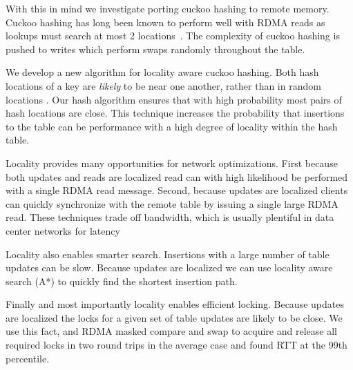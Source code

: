 With this in mind we investigate porting cuckoo hashing to
remote memory. Cuckoo hashing has long been known to perform
well with RDMA reads as lookups must search at most 2
locations~\cite{pilaf, farm}. The complexity of cuckoo
hashing is pushed to writes which perform swaps randomly
throughout the table. 

We develop a new algorithm for locality aware cuckoo
hashing. Both hash locations of a key are \textit{likely} to
be near one another, rather than in random locations . Our
hash algorithm ensures that with high probability most pairs
of hash locations are close.  This technique increases the
probability that insertions to the table can be performance
with a high degree of locality within the hash table.

Locality provides many opportunities for network
optimizations. First because both updates and reads are
localized read can with high likelihood be performed with a
single RDMA read message. Second, because updates are
localized clients can quickly synchronize with the remote
table by issuing a single large RDMA read. These techniques
trade off bandwidth, which is usually plentiful in data
center networks for latency 

Locality also enables smarter search. Insertions with a
large number of table updates can be slow. Because updates
are localized we can use locality aware search (A*) to
quickly find the shortest insertion path.  

Finally and most importantly locality enables efficient
locking. Because updates are localized the locks for a given
set of table updates are likely to be close. We use this
fact, and RDMA masked compare and swap  to
acquire and release all required locks in two round trips in
the average case and found RTT at the 99th percentile.


